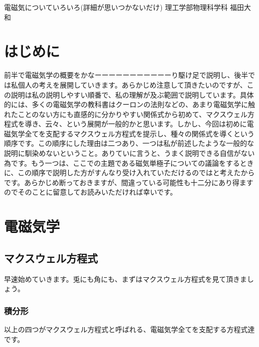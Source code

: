 \documentclass[10pt,b5paper,papersize,dvipdfmx]{jsbook}
\begin{document}
\kaishititle%
  {電磁気についていろいろ(詳細が思いつかないだけ)}%
  {理工学部物理科学科}%
  {福田大和}%



\section{はじめに}
前半で電磁気学の概要をかなーーーーーーーーーーーり駆け足で説明し、後半では私個人の考えを展開していきます。あらかじめ注意して頂きたいのですが、この説明は私の説明しやすい順番で、私の理解が及ぶ範囲で説明しています。具体的には、多くの電磁気学の教科書はクーロンの法則などの、あまり電磁気学に触れたことのない方にも直感的に分かりやすい関係式から初めて、マクスウェル方程式を導き、云々、という展開が一般的かと思います。しかし、今回は初めに電磁気学全てを支配するマクスウェル方程式を提示し、種々の関係式を導くという順序です。この順序にした理由は二つあり、一つは私が前述したような一般的な説明に馴染めないということ。ありていに言うと、うまく説明できる自信がない為です。もう一つは、ここでの主題である磁気単極子についての議論をするときに、この順序で説明した方がすんなり受け入れていただけるのではと考えたからです。あらかじめ断っておきますが、間違っている可能性も十二分にあり得ますのでそのことに留意してお読みいただければ幸いです。

\section{電磁気学}
\subsection{マクスウェル方程式}
早速始めていきます。兎にも角にも、まずはマクスウェル方程式を見て頂きましょう。
\subsubsection{積分形}

以上の四つがマクスウェル方程式と呼ばれる、電磁気学全てを支配する方程式達です。
\end{document}
